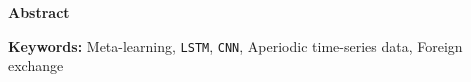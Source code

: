 
\begin{center}
    {\LARGE\bf Abstract}
\end{center}
\vspace{20pt}




\vspace{5mm}
\noindent
\textbf{Keywords:} Meta-learning, \verb|LSTM|, \verb|CNN|, Aperiodic time-series data, Foreign exchange
